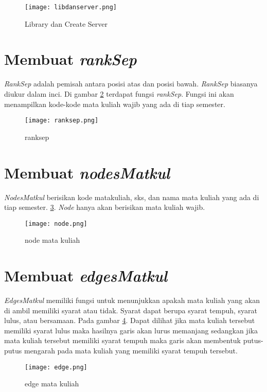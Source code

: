 \begin{figure}[H]
		\centering
		\texttt{[image: libdanserver.png]}
		\caption{Library dan Create Server}
		\label{fig: lib dan server}
\end{figure}	

\section{Membuat \textit{rankSep}}
\label{sec: Membuat rankSep}
\textit{RankSep} adalah pemisah antara posisi atas dan posisi bawah. \textit{RankSep} biasanya diukur dalam inci. Di gambar \ref{fig: ranksep} terdapat fungsi \textit{rankSep}. Fungsi ini akan menampilkan kode-kode mata kuliah wajib yang ada di tiap semester. 

\begin{figure}[H]
		\centering
		\texttt{[image: ranksep.png]}
		\caption{ranksep}
		\label{fig: ranksep}
\end{figure}	

\section{Membuat \textit{nodesMatkul}}
\label{sec: Membuat nodesMatkul}
\textit{NodesMatkul} berisikan kode matakuliah, sks, dan nama mata kuliah yang ada di tiap semester. \ref{fig: nodeMatkul}. \textit{Node} hanya akan berisikan mata kuliah wajib.

\begin{figure}[H]
		\centering
		\texttt{[image: node.png]}
		\caption{node mata kuliah}
		\label{fig: nodeMatkul}
\end{figure}	

\section{Membuat \textit{edgesMatkul}}
\label{sec: Membuat edgesMatkul}
\textit{EdgesMatkul} memiliki fungsi untuk menunjukkan apakah mata kuliah yang akan di ambil memiliki syarat atau tidak. Syarat dapat berupa syarat tempuh, syarat lulus, atau bersamaan. Pada gambar \ref{fig: edgeMatkul}. Dapat dilihat jika mata kuliah tersebut memiliki syarat lulus maka hasilnya garis akan lurus memanjang sedangkan jika mata kuliah tersebut memiliki syarat tempuh maka garis akan membentuk putus-putus mengarah pada mata kuliah yang memiliki syarat tempuh tersebut.

\begin{figure}[H]
		\centering
		\texttt{[image: edge.png]}
		\caption{edge mata kuliah}
		\label{fig: edgeMatkul}
\end{figure}	
